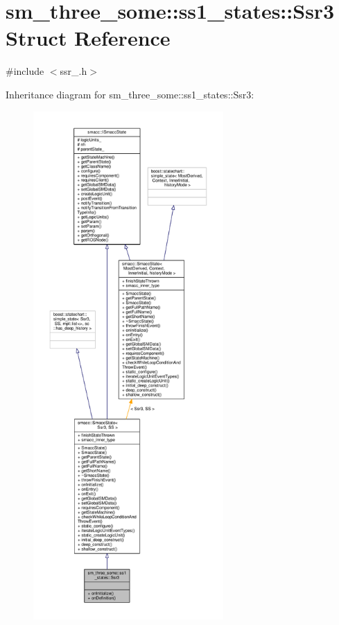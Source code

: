 \hypertarget{structsm__three__some_1_1ss1__states_1_1Ssr3}{}\section{sm\+\_\+three\+\_\+some\+:\+:ss1\+\_\+states\+:\+:Ssr3 Struct Reference}
\label{structsm__three__some_1_1ss1__states_1_1Ssr3}


{\ttfamily \#include $<$ssr\+\_.\+h$>$}



Inheritance diagram for sm\+\_\+three\+\_\+some\+:\+:ss1\+\_\+states\+:\+:Ssr3\+:\nopagebreak
\begin{figure}[H]
\begin{center}
\leavevmode
\includegraphics[height=550pt]{structsm__three__some_1_1ss1__states_1_1Ssr3__inherit__graph}
\end{center}
\end{figure}


